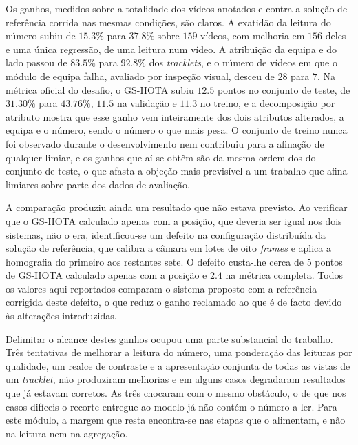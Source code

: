 Os ganhos, medidos sobre a totalidade dos vídeos anotados e contra a solução de referência corrida
nas mesmas condições, são claros. A exatidão da leitura do número subiu de $15.3\%$ para
$37.8\%$ sobre $159$ vídeos, com melhoria em $156$ deles e uma única regressão, de uma
leitura num vídeo. A atribuição da equipa e do lado passou de $83.5\%$ para $92.8\%$ dos
\emph{tracklets}, e o número de vídeos em que o módulo de equipa falha, avaliado por inspeção
visual, desceu de $28$ para $7$. Na métrica oficial do desafio, o
GS-HOTA subiu $12.5$ pontos no conjunto de teste, de $31.30\%$ para $43.76\%$,
$11.5$ na validação e $11.3$ no treino, e a decomposição por atributo mostra que
esse ganho vem inteiramente dos dois atributos alterados, a equipa e o número, sendo o número o que
mais pesa. O conjunto de treino nunca foi observado durante o desenvolvimento nem contribuiu para a
afinação de qualquer limiar, e os ganhos que aí se obtêm são da mesma ordem dos do conjunto de
teste, o que afasta a objeção mais previsível a um trabalho que afina limiares sobre parte dos dados
de avaliação.

A comparação produziu ainda um resultado que não estava previsto. Ao verificar que o GS-HOTA
calculado apenas com a posição, que deveria ser igual nos dois sistemas, não o era, identificou-se
um defeito na configuração distribuída da solução de referência, que calibra a câmara em lotes de
oito \emph{frames} e aplica a homografia do primeiro aos restantes sete. O defeito custa-lhe cerca
de $5$ pontos de GS-HOTA calculado apenas com a posição e $2.4$ na métrica
completa. Todos os valores aqui reportados comparam o sistema proposto
com a referência corrigida deste defeito, o que reduz o ganho reclamado ao que é de facto devido às
alterações introduzidas.

Delimitar o alcance destes ganhos ocupou uma parte substancial do trabalho. Três tentativas de
melhorar a leitura do número, uma ponderação das leituras por qualidade, um realce de contraste e a
apresentação conjunta de todas as vistas de um \emph{tracklet}, não produziram melhorias e em alguns
casos degradaram resultados que já estavam corretos. As três chocaram com o mesmo obstáculo, o de
que nos casos difíceis o recorte entregue ao modelo já não contém o número a ler. Para este módulo,
a margem que resta encontra-se nas etapas que o alimentam, e não na leitura nem na agregação.

